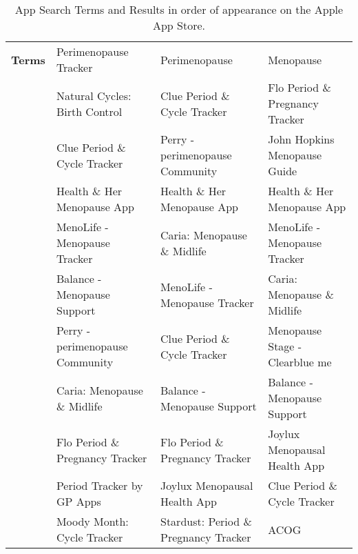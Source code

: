 \begin{table}[h!!]
    \tiny
        \begin{center}
        \caption{App Search Terms and Results in order of appearance on the Apple App Store.}
            \label{table:app-search-terms}
                \begin{tabular}{llll}
                \textbf{Terms} & Perimenopause Tracker           & Perimenopause                         & Menopause                       \\ \cline{2-4} 
                                    & Natural Cycles: Birth Control   & Clue Period \& Cycle Tracker          & Flo Period \& Pregnancy Tracker \\
                                    & Clue Period \& Cycle Tracker    & Perry - perimenopause Community       & John Hopkins Menopause Guide    \\
                                    & Health \& Her Menopause App     & Health \& Her Menopause App           & Health \& Her Menopause App     \\
                                    & MenoLife - Menopause Tracker    & Caria: Menopause \& Midlife           & MenoLife - Menopause Tracker    \\
                                    & Balance - Menopause Support     & MenoLife - Menopause Tracker          & Caria: Menopause \& Midlife     \\
                                    & Perry - perimenopause Community & Clue Period \& Cycle Tracker          & Menopause Stage - Clearblue me  \\
                                    & Caria: Menopause \& Midlife     & Balance - Menopause Support           & Balance - Menopause Support     \\
                                    & Flo Period \& Pregnancy Tracker & Flo Period \& Pregnancy Tracker       & Joylux Menopausal Health App    \\
                                    & Period Tracker by GP Apps       & Joylux Menopausal Health App          & Clue Period \& Cycle Tracker    \\
                                    & Moody Month: Cycle Tracker      & Stardust: Period \& Pregnancy Tracker & ACOG                           
                \end{tabular}
        \end{center}
  \end{table}

 


